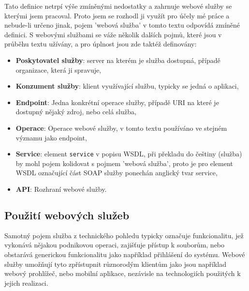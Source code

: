 \documentclass[czech,DP]{thesiskiv}
\begin{document}
Tato definice netrpí výše zmíněnými nedostatky a zahrnuje webové služby se kterými jsem pracoval. Proto jsem se rozhodl ji využít pro účely mé práce a nebude-li určeno jinak, pojem 'webová služba' v tomto textu odpovídá zmíněné definici. S webovými službami se váže několik dalších pojmů, které jsou v průběhu textu užívány, a pro úplnost jsou zde taktéž definovány:


\begin{itemize}
	\item \textbf{Poskytovatel služby}: server na kterém je služba dostupná, případě organizace, která ji spravuje,
	\item \textbf{Konzument služby}: klient využívající službu, typicky se jedná o aplikaci,
	\item \textbf{Endpoint}: Jedna konkrétní operace služby, případě URI na které je dostupný nějaký zdroj, nebo celá služba,
	\item \textbf{Operace}: Operace webové služby, v tomto textu používáno ve stejném významu jako endpoint,
	\item \textbf{Service}: element \verb|service| v popisu WSDL, při překladu do češtiny (služba) by mohl pojem kolidovat s pojmem 'webová služba', proto je pro element WSDL označující část SOAP služby ponechán anglický tvar service,
	\item \textbf{API}: Rozhraní webové služby.
\end{itemize}

\subsection{Použití webových služeb}

Samotný pojem služba z technického pohledu typicky označuje funkcionalitu, jež vykonává nějakou podnikovou operaci, zajišťuje přístup k souborům, nebo obstarává generickou funkcionalitu jako například přihlášení do systému. Webové služby umožňují tyto zpřístupnit různorodým klientům jako jsou například webový prohlížeč, nebo mobilní aplikace, nezávisle na technologiích použitých k jejich realizaci.
\end{document}
